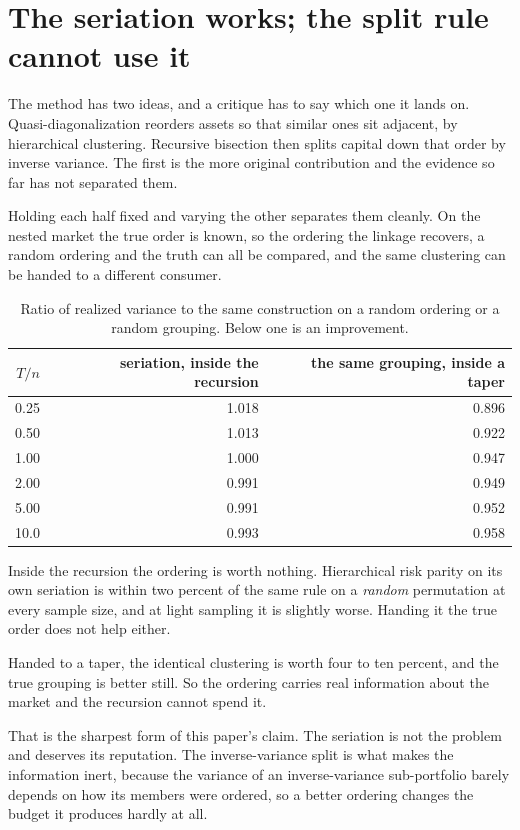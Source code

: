 \documentclass[11pt]{article}
\begin{document}
\section{The seriation works; the split rule cannot use it}

The method has two ideas, and a critique has to say which one it lands on.
Quasi-diagonalization reorders assets so that similar ones sit adjacent, by
hierarchical clustering. Recursive bisection then splits capital down that
order by inverse variance. The first is the more original contribution and the
evidence so far has not separated them.

Holding each half fixed and varying the other separates them cleanly. On the
nested market the true order is known, so the ordering the linkage recovers,
a random ordering and the truth can all be compared, and the same clustering
can be handed to a different consumer.

\begin{table}[ht]
\centering
\begin{tabular}{rrr}
\toprule
$T/n$ & seriation, inside the recursion & the same grouping, inside a taper \\
\midrule
0.25 & 1.018 & 0.896 \\
0.50 & 1.013 & 0.922 \\
1.00 & 1.000 & 0.947 \\
2.00 & 0.991 & 0.949 \\
5.00 & 0.991 & 0.952 \\
10.0 & 0.993 & 0.958 \\
\bottomrule
\end{tabular}
\caption{Ratio of realized variance to the same construction on a random
ordering or a random grouping. Below one is an improvement.}
\label{tab:seriation}
\end{table}

Inside the recursion the ordering is worth nothing. Hierarchical risk parity
on its own seriation is within two percent of the same rule on a \emph{random}
permutation at every sample size, and at light sampling it is slightly worse.
Handing it the true order does not help either.

Handed to a taper, the identical clustering is worth four to ten percent, and
the true grouping is better still. So the ordering carries real information
about the market and the recursion cannot spend it.

That is the sharpest form of this paper's claim. The seriation is not the
problem and deserves its reputation. The inverse-variance split is what makes
the information inert, because the variance of an inverse-variance
sub-portfolio barely depends on how its members were ordered, so a better
ordering changes the budget it produces hardly at all.
\end{document}
